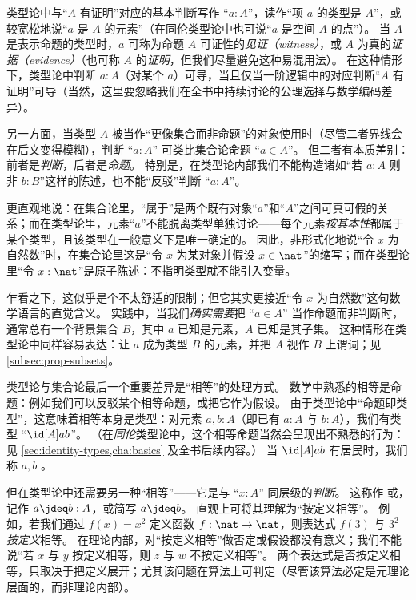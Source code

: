 类型论中与“$A$ 有证明”对应的基本判断写作 “$a:A$”，读作“项 $a$ 的类型是 $A$”，或较宽松地说“$a$ 是 $A$ 的元素”（在同伦类型论中也可说“$a$ 是空间 $A$ 的点”）。
%
%
%
当 $A$ 是表示命题的类型时，$a$ 可称为命题 $A$ 可证性的\emph{见证（witness）}，或 $A$ 为真的\emph{证据（evidence）}（也可称 $A$ 的\emph{证明}，但我们尽量避免这种易混用法）。
在这种情形下，类型论中判断 $a:A$（对某个 $a$）可导，当且仅当一阶逻辑中的对应判断“$A$ 有证明”可导（当然，这里要忽略我们在全书中持续讨论的公理选择与数学编码差异）。
 
另一方面，当类型 $A$ 被当作“更像集合而非命题”的对象使用时（尽管二者界线会在后文变得模糊），判断 “$a:A$” 可类比集合论命题 “$a\in A$”。
但二者有本质差别：前者是\emph{判断}，后者是\emph{命题}。
特别是，在类型论内部我们不能构造诸如“若 $a:A$ 则非 $b:B$”这样的陈述，也不能“反驳”判断 “$a:A$”。

更直观地说：在集合论里，“属于”是两个既有对象“$a$”和“$A$”之间可真可假的关系；而在类型论里，元素“$a$”不能脱离类型单独讨论——每个元素\emph{按其本性}都属于某个类型，且该类型在一般意义下是唯一确定的。
因此，非形式化地说“令 $x$ 为自然数”时，在集合论里这是“令 $x$ 为某对象并假设 $x\in\nat$”的缩写；而在类型论里“令 $x:\nat$”是原子陈述：不指明类型就不能引入变量。


乍看之下，这似乎是个不太舒适的限制；但它其实更接近“令 $x$ 为自然数”这句数学语言的直觉含义。
实践中，当我们\emph{确实需要}把 “$a\in A$” 当作命题而非判断时，通常总有一个背景集合 $B$，其中 $a$ 已知是元素，$A$ 已知是其子集。
这种情形在类型论中同样容易表达：让 $a$ 成为类型 $B$ 的元素，并把 $A$ 视作 $B$ 上谓词；见 \cref{subsec:prop-subsets}。

类型论与集合论最后一个重要差异是“相等”的处理方式。
数学中熟悉的相等是命题：例如我们可以反驳某个相等命题，或把它作为假设。
由于类型论中“命题即类型”，这意味着相等本身是类型：对元素 $a,b:A$（即已有 $a:A$ 与 $b:A$），我们有类型 ``$\id[A]ab$''。
（在\emph{同伦}类型论中，这个相等命题当然会呈现出不熟悉的行为：见 \cref{sec:identity-types,cha:basics} 及全书后续内容。）
当 $\id[A]ab$ 有居民时，我们称 $a,b$ 。
%
%

但在类型论中还需要另一种“相等”——它是与 “$x:A$” 同层级的\emph{判断}。
%
这称作
%
%
或，
%
%
记作 $a\jdeq b : A$，或简写 $a \jdeq b$。
直观上可将其理解为“按定义相等”。
例如，若我们通过 $f(x)=x^2$ 定义函数 $f:\nat\to\nat$，则表达式 $f(3)$ 与 $3^2$ \emph{按定义}相等。
在理论内部，对“按定义相等”做否定或假设都没有意义；我们不能说“若 $x$ 与 $y$ 按定义相等，则 $z$ 与 $w$ 不按定义相等”。
两个表达式是否按定义相等，只取决于把定义展开；尤其该问题在算法上可判定（尽管该算法必定是元理论层面的，而非理论内部）。

